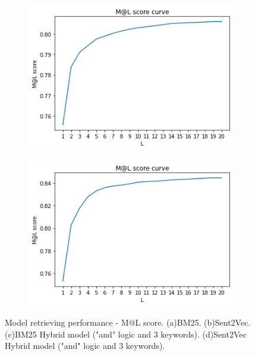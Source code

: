 \documentclass[10pt,a4paper,fleqn]{report}
\begin{document}
\begin{figure}[htbp]
\begin{subfigure}[b]{0.48\textwidth}
							\includegraphics[width=\textwidth]{figure/partA_Bm25HybridRanker_ml_score.png}
							\caption{}
							\label{fig: Bm25HybridRanker_mlscore}
						\end{subfigure}
						\hfill
						\begin{subfigure}[b]{0.48\textwidth}
							\centering
							\includegraphics[width=\textwidth]{figure/partA_Sent2VecHybridRanker_ml_score.png}
							\caption{}
							\label{fig: Sent2VecHybridRanker_mlscore}
						\end{subfigure}
						\hfill
						\caption[]{Model retrieving performance - M@L score. (a)BM25. (b)Sent2Vec. (c)BM25 Hybrid model  ("and" logic and 3 keywords). (d)Sent2Vec Hybrid model ("and" logic and 3 keywords). }
						\label{fig: }
					\end{figure}
					
\end{document}

